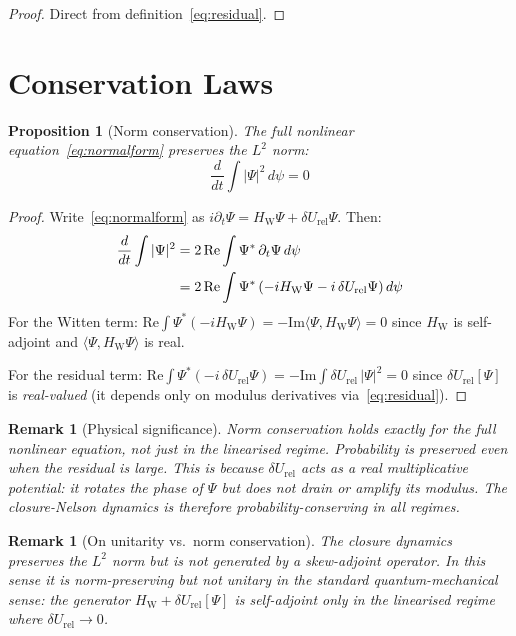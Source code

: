 \documentclass[12pt]{article}
\newtheorem{proposition}[theorem]{Proposition}
\newtheorem{remark}[theorem]{Remark}
\newcommand{\HW}{H_{\mathrm{W}}}
\newcommand{\dUrel}{\delta U_{\mathrm{rel}}}
\begin{document}
\begin{proof}
Direct from definition~\eqref{eq:residual}.
\end{proof}

\section{Conservation Laws}\label{sec:conservation}

\begin{proposition}[Norm conservation]\label{prop:norm}
The full nonlinear equation~\eqref{eq:normalform} preserves the $L^2$ norm:
\begin{equation}
    \frac{d}{dt}\int|\Psi|^2\,d\psi = 0
\end{equation}
\end{proposition}

\begin{proof}
Write~\eqref{eq:normalform} as $i\partial_t\Psi = \HW\Psi + \dUrel\Psi$. Then:
\begin{align}
    \frac{d}{dt}\int|\Psi|^2 &= 2\,\mathrm{Re}\int\Psi^*\,\partial_t\Psi\,d\psi \notag \\
    &= 2\,\mathrm{Re}\int\Psi^*\left(-i\HW\Psi - i\,\dUrel\Psi\right)d\psi
\end{align}
For the Witten term: $\mathrm{Re}\int\Psi^*(-i\HW\Psi) = -\mathrm{Im}\langle\Psi, \HW\Psi\rangle = 0$ since $\HW$ is self-adjoint and $\langle\Psi,\HW\Psi\rangle$ is real.

For the residual term: $\mathrm{Re}\int\Psi^*(-i\,\dUrel\Psi) = -\mathrm{Im}\int\dUrel\,|\Psi|^2 = 0$ since $\dUrel[\Psi]$ is \textit{real-valued} (it depends only on modulus derivatives via~\eqref{eq:residual}).
\end{proof}

\begin{remark}[Physical significance]
Norm conservation holds \textit{exactly} for the full nonlinear equation, not just in the linearised regime. Probability is preserved even when the residual is large. This is because $\dUrel$ acts as a real multiplicative potential: it rotates the phase of $\Psi$ but does not drain or amplify its modulus. The closure-Nelson dynamics is therefore probability-conserving in all regimes.
\end{remark}

\begin{remark}[On unitarity vs.\ norm conservation]
The closure dynamics preserves the $L^2$ norm but is not generated by a skew-adjoint operator. In this sense it is norm-preserving but not unitary in the standard quantum-mechanical sense: the generator $\HW + \dUrel[\Psi]$ is self-adjoint only in the linearised regime where $\dUrel \to 0$.
\end{remark}
\end{document}
